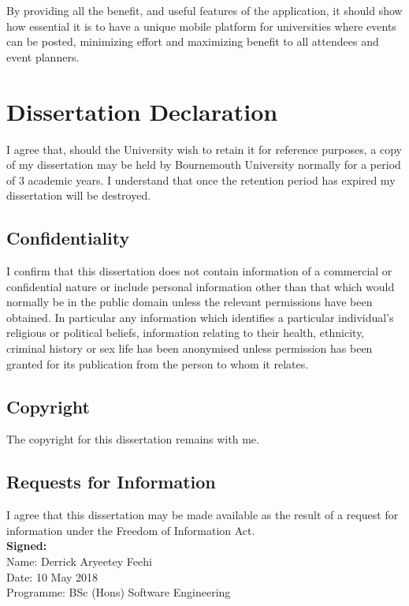 \documentclass[11pt, twoside]{report}
\begin{document}
By providing all the benefit, and useful features of the application, it should show how essential it is to have a unique mobile platform for universities where events can be posted, minimizing effort and maximizing benefit to all attendees and event planners.

\chapter*{Dissertation Declaration}
{\linespread{1.0} %
I agree that, should the University wish to retain it for reference purposes, a copy of my dissertation may be held by Bournemouth University normally for a period of 3 academic years. I understand that once the retention period has expired my dissertation will be destroyed.

\section*{Confidentiality}
I confirm that this dissertation does not contain information of a commercial or confidential nature or include personal information other than that which would normally be in the public domain unless the relevant permissions have been obtained. In particular any information which identifies a particular individual's religious or political beliefs, information relating to their health, ethnicity, criminal history or sex life has been anonymised unless permission has been granted for its publication from the person to whom it relates.

\section*{Copyright}
The copyright for this dissertation remains with me.
 
\section*{Requests for Information}
I agree that this dissertation may be made available as the result of a request for information under the Freedom of Information Act.
\\ \newline
\textbf{Signed:}
\\
Name:  Derrick Aryeetey Feehi
\\
Date: 10 May 2018
\\
Programme: BSc (Hons) Software Engineering
}
\end{document}
